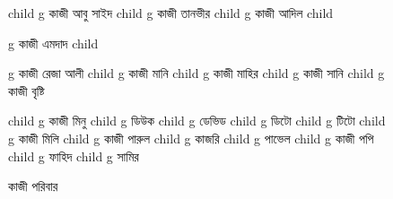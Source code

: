 \documentclass{article}
\begin{document}
\begin{figure}
{\begin{genealogypicture}
{{{{          child{    g{ কাজী আবু সাইদ }
                  child{ g{ কাজী তানভীর }
                      child{ g{ কাজী আদিল }  }
                    }
             }
          }
          child{    g{ কাজী এমদাদ } 
              child{    g{ কাজী রেজা আলী } 
                    child{    g{ কাজী মানি }
                        child{    g{ কাজী মাহির   }     }
                          }
                    child{    g{ কাজী সানি } child{    g{ কাজী বৃষ্টি  }     }  }

              }
              child{    g{ কাজী মিনু  } 
              child{    g{  ডিউক }   }
              child{    g{ ডেভিড }   }
              child{    g{ ডিটো }   }
              child{    g{ টিটো }   }
              }
              child{    g{ কাজী মিলি }   }
              child{    g{ কাজী পারুল }
                  child{    g{ কাজরি }   }
                  child{    g{ পাভেল }   }
              }
              child{    g{ কাজী পপি }
                  child{    g{ ফাহিদ }   }
                  child{    g{ সামির }   }
              }

          }

      }
    }
    }
    \end{genealogypicture}
    }
    \begin{comment}
      child{
        g{ কাজী }

      }
      \end{comment}
    \caption{কাজী পরিবার}
    \end{figure}
    
\end{document}
